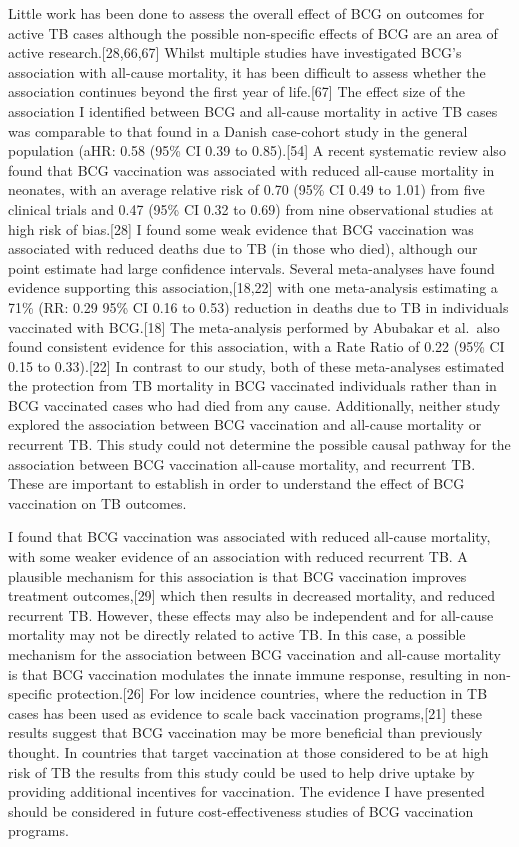 \documentclass[11pt,twoside]{bristolthesis}
\begin{document}
  Little work has been done to assess the overall effect of BCG on outcomes for active TB cases although the possible non-specific effects of BCG are an area of active research.{[}28,66,67{]} Whilst multiple studies have investigated BCG's association with all-cause mortality, it has been difficult to assess whether the association continues beyond the first year of life.{[}67{]} The effect size of the association I identified between BCG and all-cause mortality in active TB cases was comparable to that found in a Danish case-cohort study in the general population (aHR: 0.58 (95\% CI 0.39 to 0.85).{[}54{]} A recent systematic review also found that BCG vaccination was associated with reduced all-cause mortality in neonates, with an average relative risk of 0.70 (95\% CI 0.49 to 1.01) from five clinical trials and 0.47 (95\% CI 0.32 to 0.69) from nine observational studies at high risk of bias.{[}28{]} I found some weak evidence that BCG vaccination was associated with reduced deaths due to TB (in those who died), although our point estimate had large confidence intervals. Several meta-analyses have found evidence supporting this association,{[}18,22{]} with one meta-analysis estimating a 71\% (RR: 0.29 95\% CI 0.16 to 0.53) reduction in deaths due to TB in individuals vaccinated with BCG.{[}18{]} The meta-analysis performed by Abubakar et al.~also found consistent evidence for this association, with a Rate Ratio of 0.22 (95\% CI 0.15 to 0.33).{[}22{]} In contrast to our study, both of these meta-analyses estimated the protection from TB mortality in BCG vaccinated individuals rather than in BCG vaccinated cases who had died from any cause. Additionally, neither study explored the association between BCG vaccination and all-cause mortality or recurrent TB. This study could not determine the possible causal pathway for the association between BCG vaccination all-cause mortality, and recurrent TB. These are important to establish in order to understand the effect of BCG vaccination on TB outcomes.
  
  I found that BCG vaccination was associated with reduced all-cause mortality, with some weaker evidence of an association with reduced recurrent TB. A plausible mechanism for this association is that BCG vaccination improves treatment outcomes,{[}29{]} which then results in decreased mortality, and reduced recurrent TB. However, these effects may also be independent and for all-cause mortality may not be directly related to active TB. In this case, a possible mechanism for the association between BCG vaccination and all-cause mortality is that BCG vaccination modulates the innate immune response, resulting in non-specific protection.{[}26{]} For low incidence countries, where the reduction in TB cases has been used as evidence to scale back vaccination programs,{[}21{]} these results suggest that BCG vaccination may be more beneficial than previously thought. In countries that target vaccination at those considered to be at high risk of TB the results from this study could be used to help drive uptake by providing additional incentives for vaccination. The evidence I have presented should be considered in future cost-effectiveness studies of BCG vaccination programs.
  
\end{document}
